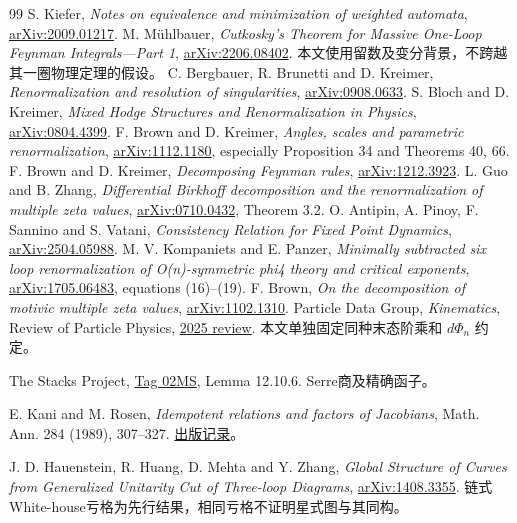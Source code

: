 \documentclass[11pt,a4paper,oneside]{ctexart}
\theoremstyle{cnplain}
\theoremstyle{definition}
\theoremstyle{remark}
\numberwithin{equation}{section}
\begin{document}
\begin{thebibliography}{99}
 S. Kiefer, \emph{Notes on equivalence and minimization of weighted automata}, \href{https://arxiv.org/abs/2009.01217}{arXiv:2009.01217}.
 M. Mühlbauer, \emph{Cutkosky's Theorem for Massive One-Loop Feynman Integrals---Part 1}, \href{https://arxiv.org/abs/2206.08402}{arXiv:2206.08402}. 本文使用留数及变分背景，不跨越其一圈物理定理的假设。
 C. Bergbauer, R. Brunetti and D. Kreimer, \emph{Renormalization and resolution of singularities}, \href{https://arxiv.org/abs/0908.0633}{arXiv:0908.0633}.
 S. Bloch and D. Kreimer, \emph{Mixed Hodge Structures and Renormalization in Physics}, \href{https://arxiv.org/abs/0804.4399}{arXiv:0804.4399}.
 F. Brown and D. Kreimer, \emph{Angles, scales and parametric renormalization}, \href{https://arxiv.org/abs/1112.1180}{arXiv:1112.1180}, especially Proposition 34 and Theorems 40, 66.
 F. Brown and D. Kreimer, \emph{Decomposing Feynman rules}, \href{https://arxiv.org/abs/1212.3923}{arXiv:1212.3923}.
 L. Guo and B. Zhang, \emph{Differential Birkhoff decomposition and the renormalization of multiple zeta values}, \href{https://arxiv.org/abs/0710.0432}{arXiv:0710.0432}, Theorem 3.2.
 O. Antipin, A. Pinoy, F. Sannino and S. Vatani, \emph{Consistency Relation for Fixed Point Dynamics}, \href{https://arxiv.org/abs/2504.05988}{arXiv:2504.05988}.
 M. V. Kompaniets and E. Panzer, \emph{Minimally subtracted six loop renormalization of O(n)-symmetric phi4 theory and critical exponents}, \href{https://arxiv.org/abs/1705.06483}{arXiv:1705.06483}, equations (16)--(19).
 F. Brown, \emph{On the decomposition of motivic multiple zeta values}, \href{https://arxiv.org/abs/1102.1310}{arXiv:1102.1310}.
 Particle Data Group, \emph{Kinematics}, Review of Particle Physics, \href{https://pdg.lbl.gov/2025/reviews/rpp2025-rev-kinematics.pdf}{2025 review}. 本文单独固定同种末态阶乘和 $d\Phi_n$ 约定。

The Stacks Project,
\href{https://stacks.math.columbia.edu/tag/02MS}{Tag 02MS},
Lemma 12.10.6. Serre商及精确函子。

E. Kani and M. Rosen,
\emph{Idempotent relations and factors of Jacobians},
Math. Ann. 284 (1989), 307--327.
\href{https://eudml.org/doc/164555}{出版记录}。


J. D. Hauenstein, R. Huang, D. Mehta and Y. Zhang,
\emph{Global Structure of Curves from Generalized Unitarity Cut of Three-loop Diagrams},
\href{https://arxiv.org/abs/1408.3355}{arXiv:1408.3355}.
链式White-house亏格为先行结果，相同亏格不证明星式图与其同构。


\end{thebibliography}
\end{document}
